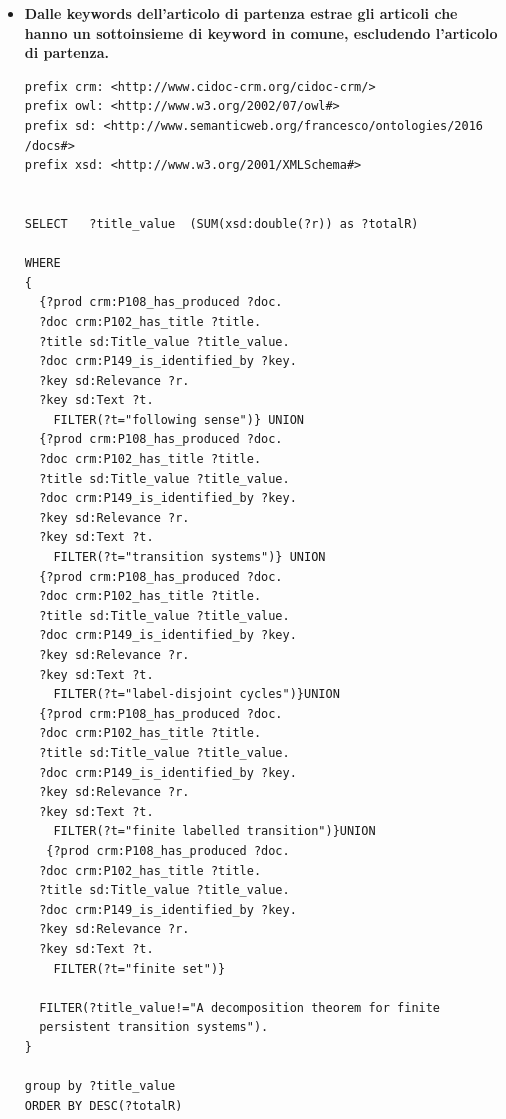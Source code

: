 \documentclass[11pt,a4paper]{article}
\begin{document}
\begin{itemize}
\item \textbf{Dalle keywords dell'articolo di partenza estrae gli articoli che hanno un sottoinsieme di keyword in comune, escludendo l'articolo di partenza.}
\begin{lstlisting}
prefix crm: <http://www.cidoc-crm.org/cidoc-crm/>
prefix owl: <http://www.w3.org/2002/07/owl#>
prefix sd: <http://www.semanticweb.org/francesco/ontologies/2016
/docs#>
prefix xsd: <http://www.w3.org/2001/XMLSchema#>


SELECT   ?title_value  (SUM(xsd:double(?r)) as ?totalR) 

WHERE
{
  {?prod crm:P108_has_produced ?doc.
  ?doc crm:P102_has_title ?title.
  ?title sd:Title_value ?title_value.
  ?doc crm:P149_is_identified_by ?key.
  ?key sd:Relevance ?r.
  ?key sd:Text ?t.
    FILTER(?t="following sense")} UNION 
  {?prod crm:P108_has_produced ?doc.
  ?doc crm:P102_has_title ?title.
  ?title sd:Title_value ?title_value.
  ?doc crm:P149_is_identified_by ?key.
  ?key sd:Relevance ?r.
  ?key sd:Text ?t.
    FILTER(?t="transition systems")} UNION
  {?prod crm:P108_has_produced ?doc.
  ?doc crm:P102_has_title ?title.
  ?title sd:Title_value ?title_value.
  ?doc crm:P149_is_identified_by ?key.
  ?key sd:Relevance ?r.
  ?key sd:Text ?t.
    FILTER(?t="label-disjoint cycles")}UNION
  {?prod crm:P108_has_produced ?doc.
  ?doc crm:P102_has_title ?title.
  ?title sd:Title_value ?title_value.
  ?doc crm:P149_is_identified_by ?key.
  ?key sd:Relevance ?r.
  ?key sd:Text ?t.
    FILTER(?t="finite labelled transition")}UNION
   {?prod crm:P108_has_produced ?doc.
  ?doc crm:P102_has_title ?title.
  ?title sd:Title_value ?title_value.
  ?doc crm:P149_is_identified_by ?key.
  ?key sd:Relevance ?r.
  ?key sd:Text ?t.
    FILTER(?t="finite set")}
  
  FILTER(?title_value!="A decomposition theorem for finite 
  persistent transition systems").
}

group by ?title_value
ORDER BY DESC(?totalR) 
\end{lstlisting}
\end{itemize}
\end{document}
